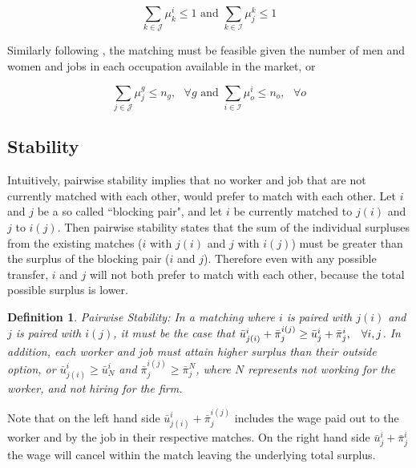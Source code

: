 \documentclass[12pt]{article}
\newtheorem{definition}{Definition}
\begin{document}
$$ \sum_{k \in \mathcal{J}} \mu^i_k \leq 1 \text{ and }  \sum_{k \in \mathcal{I}} \mu^k_j \leq 1$$

Similarly following , the matching must be feasible given the number of men and women and jobs in each occupation available in the market, or

$$ \sum_{j \in \mathcal{J}} \mu^g_j \leq n_g, \text{ } \forall g \text{ and }  \sum_{i \in \mathcal{I}} \mu^i_o \leq n_o, \text{ } \forall o$$

\subsection{Stability}

Intuitively, pairwise stability implies that no worker and job that are not currently matched with each other, would prefer to match with each other. Let $i$ and $j$ be a so called ``blocking pair", and let $i$ be currently matched to $j(i)$ and $j$ to $i(j)$. Then pairwise stability states that the sum of the individual surpluses from the existing matches ($i$ with $j(i)$ and $j$ with $i(j)$) must be greater than the surplus of the blocking pair ($i$ and $j$). Therefore even with any possible transfer, $i$ and $j$ will not both prefer to match with each other, because the total possible surplus is lower.

\begin{definition}
Pairwise Stability: In a matching where $i$ is paired with $j(i)$ and $j$ is paired with $i(j)$, it must be the case that $\bar{u}^{i}_{j(i)}+ \bar{\pi}^{i(j)}_j \geq \bar{u}^{i}_{j} + \bar{\pi}^{i}_j, \hspace{3mm}  \forall i,j$. In addition, each worker and job must attain higher surplus than their outside option, or $\bar{u}^{i}_{j(i)} \geq \bar{u}^{i}_{N}$ and $\bar{\pi}^{i(j)}_j \geq \bar{\pi}^{N}_j $, where $N$ represents not working for the worker, and not hiring for the firm.
 \end{definition}
 
Note that on the left hand side $\bar{u}^{i}_{j(i)}+ \bar{\pi}^{i(j)}_j$ includes the wage paid out to the worker and by the job in their respective matches. On the right hand side $\bar{u}^{i}_{j} + \bar{\pi}^{i}_j$ the wage will cancel within the match leaving the underlying total surplus. 
\end{document}
